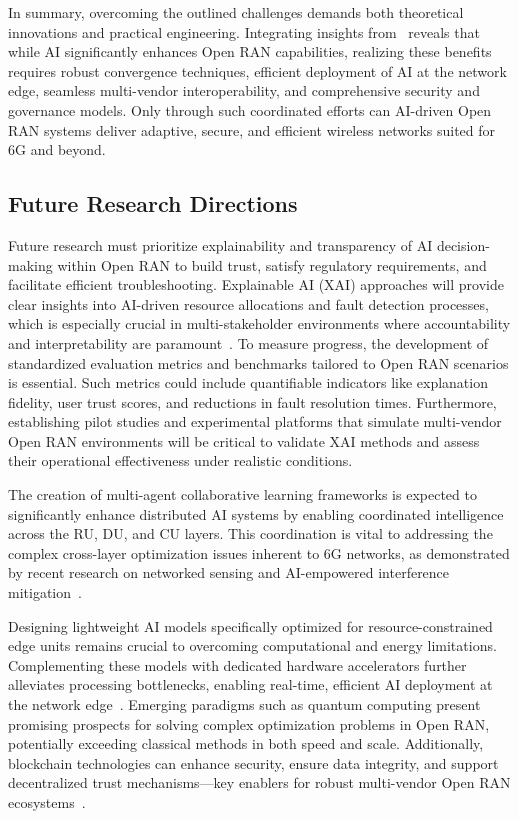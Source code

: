 \documentclass[sigconf]{acmart}
\begin{document}
In summary, overcoming the outlined challenges demands both theoretical innovations and practical engineering. Integrating insights from~\cite{ref48,ref49,ref50,ref54} reveals that while AI significantly enhances Open RAN capabilities, realizing these benefits requires robust convergence techniques, efficient deployment of AI at the network edge, seamless multi-vendor interoperability, and comprehensive security and governance models. Only through such coordinated efforts can AI-driven Open RAN systems deliver adaptive, secure, and efficient wireless networks suited for 6G and beyond.

\subsection{Future Research Directions}

Future research must prioritize explainability and transparency of AI decision-making within Open RAN to build trust, satisfy regulatory requirements, and facilitate efficient troubleshooting. Explainable AI (XAI) approaches will provide clear insights into AI-driven resource allocations and fault detection processes, which is especially crucial in multi-stakeholder environments where accountability and interpretability are paramount~\cite{ref54}. To measure progress, the development of standardized evaluation metrics and benchmarks tailored to Open RAN scenarios is essential. Such metrics could include quantifiable indicators like explanation fidelity, user trust scores, and reductions in fault resolution times. Furthermore, establishing pilot studies and experimental platforms that simulate multi-vendor Open RAN environments will be critical to validate XAI methods and assess their operational effectiveness under realistic conditions.

The creation of multi-agent collaborative learning frameworks is expected to significantly enhance distributed AI systems by enabling coordinated intelligence across the RU, DU, and CU layers. This coordination is vital to addressing the complex cross-layer optimization issues inherent to 6G networks, as demonstrated by recent research on networked sensing and AI-empowered interference mitigation~\cite{ref48}.

Designing lightweight AI models specifically optimized for resource-constrained edge units remains crucial to overcoming computational and energy limitations. Complementing these models with dedicated hardware accelerators further alleviates processing bottlenecks, enabling real-time, efficient AI deployment at the network edge~\cite{ref50}. Emerging paradigms such as quantum computing present promising prospects for solving complex optimization problems in Open RAN, potentially exceeding classical methods in both speed and scale. Additionally, blockchain technologies can enhance security, ensure data integrity, and support decentralized trust mechanisms—key enablers for robust multi-vendor Open RAN ecosystems~\cite{ref54}.
\end{document}
